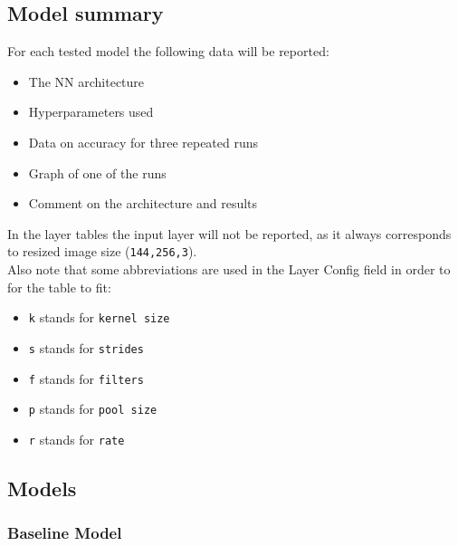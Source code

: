 \documentclass[a4paper,12pt]{article}
\begin{document}
\subsection{Model summary}
For each tested model the following data will be reported:
\begin{itemize}
\item The NN architecture
\item Hyperparameters used
\item Data on accuracy for three repeated runs
\item Graph of one of the runs
\item Comment on the architecture and results
\end{itemize}
In the layer tables the input  layer will not be reported, as it always corresponds to resized image size (\texttt{144,256,3}).\\
Also note that some abbreviations are used in the Layer Config field in order to for the table to fit:
\begin{itemize}
\item \texttt{k} stands for \texttt{kernel size}
\item \texttt{s} stands for \texttt{strides}
\item \texttt{f} stands for \texttt{filters}
\item \texttt{p} stands for \texttt{pool size}
\item \texttt{r} stands for \texttt{rate}
\end{itemize}

\newcommand{\conv}{Convolution(\texttt{Conv2d})}
\newcommand{\convP}[3]{\texttt{k=#1, s=#2, f=#3}}
\newcommand{\convKSF}[3]{\convP{#1}{#2}{#3}}

\newcommand{\flt}{Flatten(\texttt{Flatten})}

\newcommand{\dns}{Dense(\texttt{Dense})}
\newcommand{\dnsP}[1]{\texttt{u=#1}}

\newcommand{\pool}{MaxPooling(\texttt{MaxPooling2D})}
\newcommand{\poolN}{\texttt{p=2x2}}

\newcommand{\drop}{Dropout(\texttt{Dropout})}
\newcommand{\dropR}[1]{\texttt{r=#1}}

\newcommand{\bat}{Batch Norm.(\texttt{BatchN.})}
\subsection{Models}

\subsubsection{Baseline Model}

\end{document}
